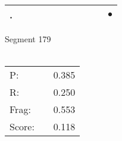 \documentclass[landscape]{article}
\newcommand{\ssp}{\hspace{2pt}}
\newcommand{\mex}{\cellcolor{g}$\bullet$}
\begin{document}
\begin{tabular}{|l|p{10pt}|p{10pt}|p{10pt}|p{10pt}|p{10pt}|p{10pt}|p{10pt}|p{10pt}|p{10pt}|p{10pt}|}
\hline
\ssp \cellcolor{ref9}. \ssp&\hspace{2pt}&\hspace{2pt}&\hspace{2pt}&\hspace{2pt}&\hspace{2pt}&\hspace{2pt}&\hspace{2pt}&\hspace{2pt}&\hspace{2pt}&\hspace{2pt}\mex\\
\hline
\end{tabular}

\vspace{6pt}
\noindent Segment 179\\\\
\noindent\begin{tabular}{lm{12pt}r}
\hline
P:&&0.385\\
R:&&0.250\\
Frag:&&0.553\\
Score:&&0.118\\
\end{tabular}

\newpage
\end{document}
